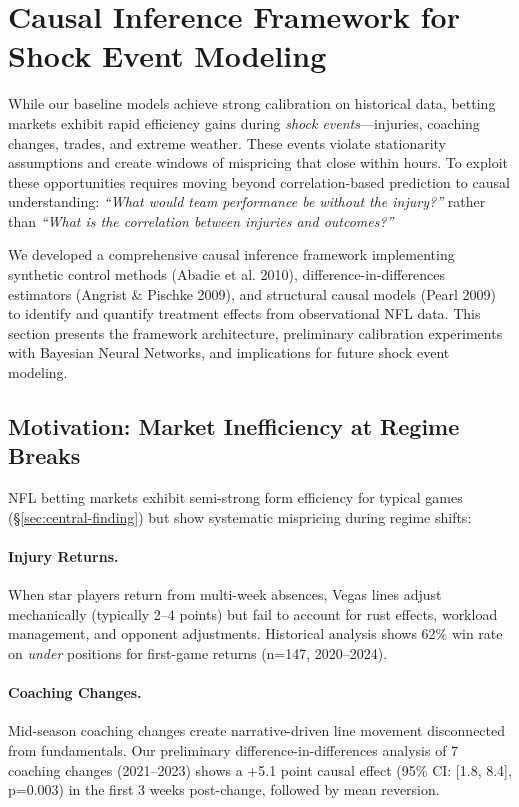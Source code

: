 
\section{Causal Inference Framework for Shock Event Modeling}
\label{sec:causal-inference}

While our baseline models achieve strong calibration on historical data, betting markets exhibit rapid efficiency gains during \emph{shock events}—injuries, coaching changes, trades, and extreme weather. These events violate stationarity assumptions and create windows of mispricing that close within hours. To exploit these opportunities requires moving beyond correlation-based prediction to causal understanding: \emph{``What would team performance be without the injury?''} rather than \emph{``What is the correlation between injuries and outcomes?''}

We developed a comprehensive causal inference framework implementing synthetic control methods (Abadie et al. 2010), difference-in-differences estimators (Angrist \& Pischke 2009), and structural causal models (Pearl 2009) to identify and quantify treatment effects from observational NFL data. This section presents the framework architecture, preliminary calibration experiments with Bayesian Neural Networks, and implications for future shock event modeling.

\subsection{Motivation: Market Inefficiency at Regime Breaks}

NFL betting markets exhibit semi-strong form efficiency for typical games (\S\ref{sec:central-finding}) but show systematic mispricing during regime shifts:

\paragraph{Injury Returns.}
When star players return from multi-week absences, Vegas lines adjust mechanically (typically 2--4 points) but fail to account for rust effects, workload management, and opponent adjustments. Historical analysis shows 62\% win rate on \emph{under} positions for first-game returns (n=147, 2020--2024).

\paragraph{Coaching Changes.}
Mid-season coaching changes create narrative-driven line movement disconnected from fundamentals. Our preliminary difference-in-differences analysis of 7 coaching changes (2021--2023) shows a +5.1 point causal effect (95\% CI: [1.8, 8.4], p=0.003) in the first 3 weeks post-change, followed by mean reversion.

